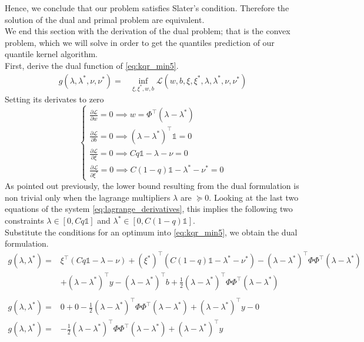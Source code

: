 Hence, we conclude that our problem satisfies Slater's condition. Therefore the solution of the dual and primal problem are equivalent.
\\
We end this section with the derivation of the dual problem; that is the convex problem, which we will solve in order to get the quantiles prediction of our quantile kernel algorithm.
\\
First, derive the dual function of \ref{eq:kqr_min5}.
\begin{equation}
    \begin{aligned}
        g(\lambda, \lambda^*, \nu, \nu^*)= & \inf_{\xi, \xi^*, w, b} \mathcal{L}(w,b,\xi,\xi^*,\lambda, \lambda^*, \nu, \nu^*)
\end{aligned}
\end{equation}
Setting its derivates to zero
\begin{equation}\label{eq:lagrange_derivatives}
    \begin{cases}
        \frac{\partial \mathcal{L}}{\partial w}=0 \implies w=\Phi^\intercal(\lambda-\lambda^*)
        \\
        \frac{\partial \mathcal{L}}{\partial b}=0 \implies (\lambda-\lambda^*)^\intercal\mathbb{1}=0
        \\
        \frac{\partial \mathcal{L}}{\partial \xi}=0 \implies Cq \mathbb{1}-\lambda- \nu=0
        \\
        \frac{\partial \mathcal{L}}{\partial \xi^*}=0 \implies C(1-q)\mathbb{1} -\lambda^* -\nu^*=0
    \end{cases}
\end{equation}
As pointed out previously, the lower bound resulting from the dual formulation is non trivial only when the lagrange multipliers $\lambda$ are $\succeq 0$. Looking at the last two equations of the system \ref{eq:lagrange_derivatives}, this implies the following two constraints $\lambda \in [0, Cq\mathbb{1}]$ and $\lambda^*\in [0, C(1-q)\mathbb{1}]$.
\\
Substitute the conditions for an optimum into \ref{eq:kqr_min5}, we obtain the dual formulation.
\begin{equation}
    \begin{aligned}
        g(\lambda, \lambda^*)=& \xi^\intercal(Cq\mathbb{1}-\lambda -\nu)+(\xi^*)^\intercal(C(1-q)\mathbb{1}-\lambda^*-\nu^*)-(\lambda-\lambda^*)^\intercal \Phi\Phi^\intercal(\lambda-\lambda^*)
        \\
        & +(\lambda-\lambda^*)^\intercal y-(\lambda-\lambda^*)^\intercal b+\frac{1}{2}(\lambda-\lambda^*)^\intercal \Phi\Phi^\intercal(\lambda-\lambda^*)
        \\
        \\
        g(\lambda, \lambda^*)=& 0+0-\frac{1}{2}(\lambda-\lambda^*)^\intercal \Phi\Phi^\intercal(\lambda-\lambda^*)+(\lambda-\lambda^*)^\intercal y-0
        \\
        g(\lambda, \lambda^*)=& -\frac{1}{2}(\lambda-\lambda^*)^\intercal \Phi\Phi^\intercal(\lambda-\lambda^*)+(\lambda-\lambda^*)^\intercal y
    \end{aligned}
\end{equation}
